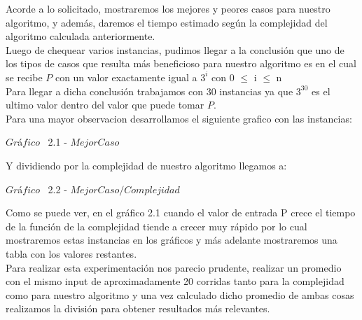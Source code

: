\indent Acorde a lo solicitado, mostraremos los mejores y peores casos para nuestro algoritmo, y adem\'as, daremos el tiempo estimado 
seg\'un la complejidad del algoritmo calculada anteriormente.\\

Luego de chequear varios instancias, pudimos llegar a la conclusi\'on que uno de los tipos de casos que resulta m\'as beneficioso para nuestro algoritmo
es en el cual se recibe $P$ con un valor exactamente igual a $3^i$ con 0 $\leq$ i $\leq$ n \\

Para llegar a dicha conclusi\'on trabajamos con 30 instancias ya que $3^{30}$ es el ultimo valor dentro del valor que puede tomar $P$.\\

Para una mayor observacion desarrollamos el siguiente grafico con las instancias:\\

\vspace*{0.3cm} \vspace*{0.3cm}
  \begin{center}
 {$Gr$\'a$fico$ \ 2.1 - $Mejor Caso$}
  \end{center}
  \vspace*{0.3cm}
  
Y dividiendo por la complejidad de nuestro algoritmo llegamos a:\\

\vspace*{0.3cm} \vspace*{0.3cm}
  \begin{center}
{$Gr$\'a$fico$ \ 2.2 - $Mejor Caso / Complejidad$}
  \end{center}
  \vspace*{0.3cm}

Como se puede ver, en el gr\'afico 2.1 cuando el valor de entrada P crece el tiempo de la funci\'on de la complejidad tiende a crecer muy r\'apido por lo cual mostraremos estas instancias en los gr\'aficos y m\'as adelante mostraremos una tabla con los valores restantes.\\

Para realizar esta experimentaci\'on nos parecio prudente, realizar un promedio con el mismo input de aproximadamente 20 corridas
tanto para la complejidad como para nuestro algoritmo y una vez calculado dicho promedio de ambas cosas realizamos la divisi\'on para
obtener resultados m\'as relevantes.\\ 

